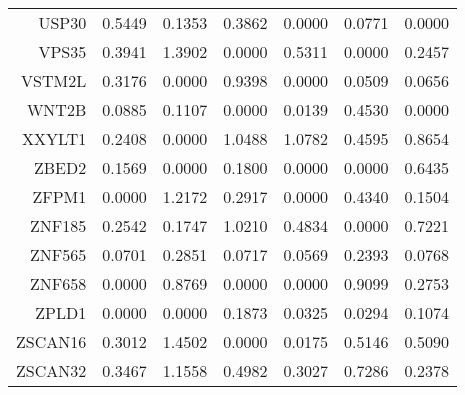 \begin{longtable}{rrrrrrr}
  USP30 & 0.5449 & 0.1353 & 0.3862 & 0.0000 & 0.0771 & 0.0000 \\ 
  VPS35 & 0.3941 & 1.3902 & 0.0000 & 0.5311 & 0.0000 & 0.2457 \\ 
  VSTM2L & 0.3176 & 0.0000 & 0.9398 & 0.0000 & 0.0509 & 0.0656 \\ 
  WNT2B & 0.0885 & 0.1107 & 0.0000 & 0.0139 & 0.4530 & 0.0000 \\ 
  XXYLT1 & 0.2408 & 0.0000 & 1.0488 & 1.0782 & 0.4595 & 0.8654 \\ 
  ZBED2 & 0.1569 & 0.0000 & 0.1800 & 0.0000 & 0.0000 & 0.6435 \\ 
  ZFPM1 & 0.0000 & 1.2172 & 0.2917 & 0.0000 & 0.4340 & 0.1504 \\ 
  ZNF185 & 0.2542 & 0.1747 & 1.0210 & 0.4834 & 0.0000 & 0.7221 \\ 
  ZNF565 & 0.0701 & 0.2851 & 0.0717 & 0.0569 & 0.2393 & 0.0768 \\ 
  ZNF658 & 0.0000 & 0.8769 & 0.0000 & 0.0000 & 0.9099 & 0.2753 \\ 
  ZPLD1 & 0.0000 & 0.0000 & 0.1873 & 0.0325 & 0.0294 & 0.1074 \\ 
  ZSCAN16 & 0.3012 & 1.4502 & 0.0000 & 0.0175 & 0.5146 & 0.5090 \\ 
  ZSCAN32 & 0.3467 & 1.1558 & 0.4982 & 0.3027 & 0.7286 & 0.2378 \\ 
   \hline
\hline
\end{longtable}
